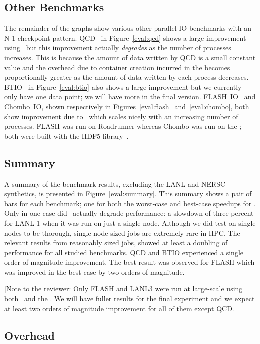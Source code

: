 \subsection{Other Benchmarks}

The remainder of the graphs show various other parallel IO benchmarks with an
N-1 checkpoint pattern. QCD~\cite{qcd-io} in Figure~\ref{eval:qcd} shows a
large improvement using \plfs\ but this improvement actually {\em degrades} as
the number of processes increases. This is because the amount of data written
by QCD is a small constant value and the overhead due to container creation
incurred in the  becomes proportionally greater as the amount of
data written by each process decreases. BTIO~\cite{btio-io} in
Figure~\ref{eval:btio} also shows a large improvement but we currently only
have one data point; we will have more in the final version.
FLASH~IO~\cite{flash-io} and Chombo~IO\cite{chombo-io}, shown respectively in
Figures~\ref{eval:flash}~and~\ref{eval:chombo}, both show improvement due to
\plfs\ which scales nicely with an increasing number of processes. FLASH was
run on Roadrunner whereas Chombo was run on the \rrz; both were built with the
HDF5 library~\cite{hdf5}.

\subsection{Summary}

A summary of the benchmark results, excluding the LANL and NERSC synthetics, is
presented in Figure~\ref{eval:summary}. This summary shows a pair of bars for
each benchmark; one for both the worst-case and best-case speedups for \plfs.
Only in one case did \plfs\ actually degrade performance: a slowdown of three
percent for LANL 1 when it was run on just a single node. Although we did test
on single nodes to be thorough, single node sized jobs are extremely rare in
HPC. The relevant results from reasonably sized jobs, showed at least a
doubling of performance for all studied benchmarks. QCD and BTIO experienced a
single order of magnitude improvement. The best result was observed for FLASH
which was improved in the best case by two orders of magnitude. 

[Note to the reviewer: Only FLASH and LANL3 were run at large-scale using both
\plfs\ and the \upfs. We will have fuller results for the final experiment and
we expect at least two orders of magnitude improvement for all of them except
QCD.]

\subsection{Overhead}
\label{overhead}


